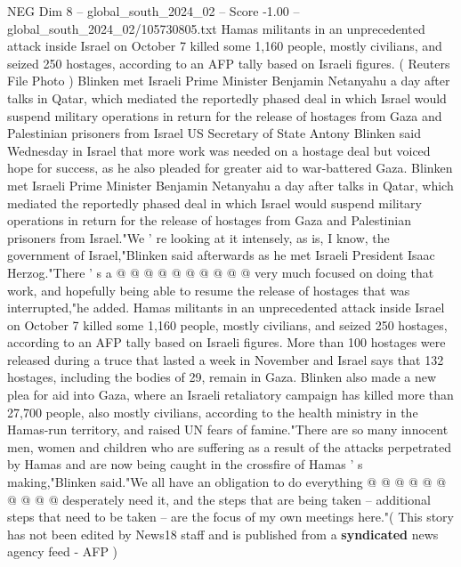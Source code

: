 \begin{textsample}{NEG Dim 8 – global\_south\_2024\_02 – Score -1.00 – global\_south\_2024\_02/105730805.txt}  \label{ex:f8_neg_061}
Hamas militants in an unprecedented attack inside Israel on October 7 killed some 1,160 people, mostly civilians, and seized 250 hostages, according to an AFP tally based on Israeli figures. ( Reuters File Photo ) Blinken met Israeli Prime Minister Benjamin Netanyahu a day after talks in Qatar, which mediated the reportedly phased deal in which Israel would suspend military operations in return for the release of hostages from Gaza and Palestinian prisoners from Israel US Secretary of State Antony Blinken said Wednesday in Israel that more work was needed on a hostage deal but voiced hope for success, as he also pleaded for greater aid to war-battered Gaza.
Blinken met Israeli Prime Minister Benjamin Netanyahu a day after talks in Qatar, which mediated the reportedly phased deal in which Israel would suspend military operations in return for the release of hostages from Gaza and Palestinian prisoners from Israel."We ' re looking at it intensely, as is, I know, the government of Israel,"Blinken said afterwards as he met Israeli President Isaac Herzog."There ' s a @ @ @ @ @ @ @ @ @ @ very much focused on doing that work, and hopefully being able to resume the release of hostages that was interrupted,"he added.
Hamas militants in an unprecedented attack inside Israel on October 7 killed some 1,160 people, mostly civilians, and seized 250 hostages, according to an AFP tally based on Israeli figures.
More than 100 hostages were released during a truce that lasted a week in November and Israel says that 132 hostages, including the bodies of 29, remain in Gaza.
Blinken also made a new plea for aid into Gaza, where an Israeli retaliatory campaign has killed more than 27,700 people, also mostly civilians, according to the health ministry in the Hamas-run territory, and raised UN fears of famine."There are so many innocent men, women and children who are suffering as a result of the attacks perpetrated by Hamas and are now being caught in the crossfire of Hamas ' s making,"Blinken said."We all have an obligation to do everything @ @ @ @ @ @ @ @ @ @ desperately need it, and the steps that are being taken -- additional steps that need to be taken -- are the focus of my own meetings here."( This story has not been edited by News18 staff and is published from a \textbf{syndicated} news agency feed - AFP )

\end{textsample}

